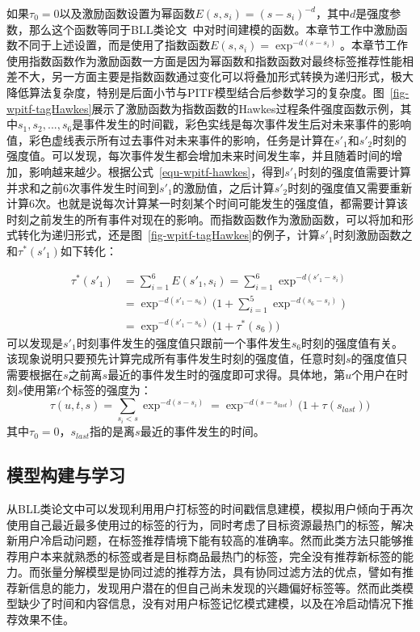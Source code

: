 如果$\tau_0=0$以及激励函数设置为幂函数$E(s,s_i)=(s-s_i)^{-d}$，其中$d$是强度参数，那么这个函数等同于BLL类论文~\cite{kowald2014long,kowald2015forgetting,kowald2015refining}中对时间建模的函数。本章节工作中激励函数不同于上述设置，而是使用了指数函数$E(s,s_i)=\exp^{-d(s-s_i)}$。本章节工作使用指数函数作为激励函数一方面是因为幂函数和指数函数对最终标签推荐性能相差不大，另一方面主要是指数函数通过变化可以将叠加形式转换为递归形式，极大降低算法复杂度，特别是后面小节与PITF模型结合后参数学习的复杂度。图~\ref{fig-wpitf-tagHawkes}展示了激励函数为指数函数的Hawkes过程条件强度函数示例，其中$s_1, s_2,..., s_6$是事件发生的时间戳，彩色实线是每次事件发生后对未来事件的影响值，彩色虚线表示所有过去事件对未来事件的影响，任务是计算在$s'_1$和$s'_2$时刻的强度值。可以发现，每次事件发生都会增加未来时间发生率，并且随着时间的增加，影响越来越少。根据公式~\ref{equ-wpitf-hawkes}，得到$s'_1$时刻的强度值需要计算并求和之前6次事件发生时间到$s'_1$的激励值，之后计算$s'_2$时刻的强度值又需要重新计算6次。也就是说每次计算某一时刻某个时间可能发生的强度值，都需要计算该时刻之前发生的所有事件对现在的影响。而指数函数作为激励函数，可以将加和形式转化为递归形式，还是图~\ref{fig-wpitf-tagHawkes}的例子，计算$s'_1$时刻激励函数之和$\tau^*(s'_1)$如下转化：

\begin{align}
\tau^*(s'_1) &= \sum_{i=1}^6E(s'_1,s_i)=\sum_{i=1}^6 \exp^{-d(s'_1-s_i)}\nonumber\\
&=\exp^{-d(s'_1-s_6)}\big(1+ \sum_{i=1}^5\exp^{-d(s_6-s_i)}\big)\nonumber\\
&=\exp^{-d(s'_1-s_6)}\big(1+\tau^*(s_6)\big)
\end{align}
可以发现是$s'_1$时刻事件发生的强度值只跟前一个事件发生$s_6$时刻的强度值有关。该现象说明只要预先计算完成所有事件发生时刻的强度值，任意时刻$s$的强度值只需要根据在$s$之前离$s$最近的事件发生时的强度即可求得。具体地，第$u$个用户在时刻$s$使用第$t$个标签的强度为：
\begin{equation}
\label{equ-wpitf-hawkes-user}
\tau(u,t,s) = \sum_{s_i<s} \exp^{-d(s-s_i)}= \exp^{-d(s-s_{last})}\big(1+\tau(s_{last})\big)
\end{equation}
其中$\tau_0=0$，$s_{last}$指的是离$s$最近的事件发生的时间。

\subsection{模型构建与学习}
从BLL类论文中可以发现利用用户打标签的时间戳信息建模，模拟用户倾向于再次使用自己最近最多使用过的标签的行为，同时考虑了目标资源最热门的标签，解决新用户冷启动问题，在标签推荐情境下能有较高的准确率。然而此类方法只能够推荐用户本来就熟悉的标签或者是目标商品最热门的标签，完全没有推荐新标签的能力。而张量分解模型是协同过滤的推荐方法，具有协同过滤方法的优点，譬如有推荐新信息的能力，发现用户潜在的但自己尚未发现的兴趣偏好标签等。然而此类模型缺少了时间和内容信息，没有对用户标签记忆模式建模，以及在冷启动情况下推荐效果不佳。

